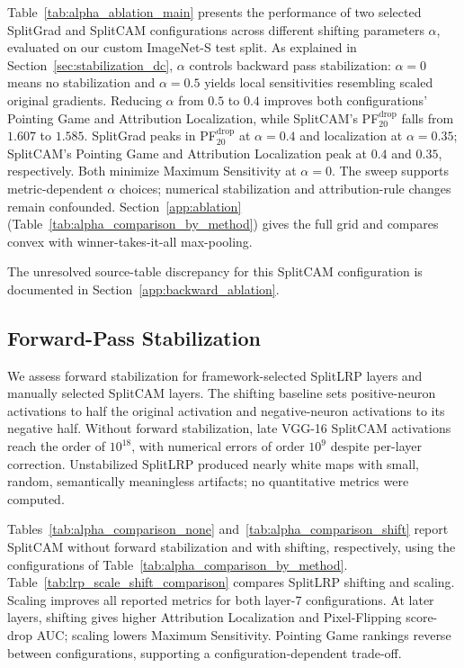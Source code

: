 Table~\ref{tab:alpha_ablation_main} presents the performance of two selected SplitGrad and SplitCAM configurations across different shifting parameters $\alpha$, evaluated on our custom ImageNet-S test split. As explained in Section~\ref{sec:stabilization_dc}, $\alpha$ controls backward pass stabilization: $\alpha = 0$ means no stabilization and $\alpha = 0.5$ yields local sensitivities resembling scaled original gradients. Reducing $\alpha$ from $0.5$ to $0.4$ improves both configurations' Pointing Game and Attribution Localization, while SplitCAM's PF$^{\mathrm{drop}}_{20}$ falls from $1.607$ to $1.585$. SplitGrad peaks in PF$^{\mathrm{drop}}_{20}$ at $\alpha = 0.4$ and localization at $\alpha = 0.35$; SplitCAM's Pointing Game and Attribution Localization peak at $0.4$ and $0.35$, respectively. Both minimize Maximum Sensitivity at $\alpha = 0$. The sweep supports metric-dependent $\alpha$ choices; numerical stabilization and attribution-rule changes remain confounded. Section~\ref{app:ablation} (Table~\ref{tab:alpha_comparison_by_method}) gives the full grid and compares convex with winner-takes-it-all max-pooling.

The unresolved source-table discrepancy for this SplitCAM configuration is documented in Section~\ref{app:backward_ablation}.

\subsection{Forward-Pass Stabilization}\label{app:forward_ablation}

We assess forward stabilization for framework-selected SplitLRP layers and manually selected SplitCAM layers. The shifting baseline sets positive-neuron activations to half the original activation and negative-neuron activations to its negative half. Without forward stabilization, late VGG-16 SplitCAM activations reach the order of $10^{18}$, with numerical errors of order $10^{9}$ despite per-layer correction. Unstabilized SplitLRP produced nearly white maps with small, random, semantically meaningless artifacts; no quantitative metrics were computed.

Tables~\ref{tab:alpha_comparison_none} and~\ref{tab:alpha_comparison_shift} report SplitCAM without forward stabilization and with shifting, respectively, using the configurations of Table~\ref{tab:alpha_comparison_by_method}. Table~\ref{tab:lrp_scale_shift_comparison} compares SplitLRP shifting and scaling. Scaling improves all reported metrics for both layer-7 configurations. At later layers, shifting gives higher Attribution Localization and Pixel-Flipping score-drop AUC; scaling lowers Maximum Sensitivity. Pointing Game rankings reverse between configurations, supporting a configuration-dependent trade-off.

